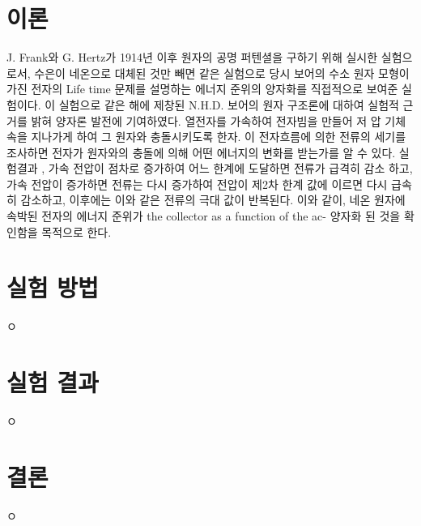 \documentclass[a4paper, 10pt, nanum]{CSUniSchoolLabReport}
\begin{document}
\section{이론}

  J. Frank와 G. Hertz가 1914년 이후 원자의 공명 퍼텐셜을 구하기 위해 실시한 실험으로서, 수은이 네온으로 대체된 것만 빼면 같은 실험으로 당시 보어의 수소 원자 모형이 가진 전자의 Life time 문제를 설명하는 에너지 준위의 양자화를 직접적으로 보여준 실험이다. 이 실험으로 같은 해에 제창된 N.H.D. 보어의 원자 구조론에 대하여 실험적 근거를 밝혀 양자론 발전에 기여하였다. 열전자를 가속하여 전자빔을 만들어 저
  압 기체 속을 지나가게 하여 그 원자와 충돌시키도록 한자. 이 전자흐름에 의한 전류의 세기를 조사하면 전자가 원자와의 충돌에 의해 어떤 에너지의 변화를 받는가를 알 수 있다. 실험결과 , 가속 전압이 점차로 증가하여 어느 한계에 도달하면 전류가 급격히 감소
  하고, 가속 전압이 증가하면 전류는 다시 증가하여 전압이 제2차 한계 값에 이르면 다시 급속히 감소하고, 이후에는 이와 같은 전류의 극대 값이 반복된다. 이와 같이, 네온 원자에 속박된 전자의 에너지 준위가
  the collector as a function of the ac- 양자화 된 것을 확인함을 목적으로 한다. 


\section{실험 방법}

	ㅇ


\section{실험 결과}

	ㅇ



\section{결론}

	ㅇ



\end{document}
